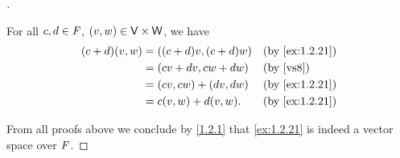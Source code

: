 \begin{proof}[]
\begin{description}
			For all \(c, d \in \mathit{F}\), \((v, w) \in \mathsf{V} \times \mathsf{W}\), we have
			\begin{align*}
				(c + d) (v, w) & = ((c + d) v, (c + d) w) &  & \text{(by \cref{ex:1.2.21})} \\
				               & = (cv + dv, cw + dw)     &  & \text{(by \ref{vs8})}        \\
				               & = (cv, cw) + (dv, dw)    &  & \text{(by \cref{ex:1.2.21})} \\
				               & = c(v, w) + d(v, w).     &  & \text{(by \cref{ex:1.2.21})}
			\end{align*}
	\end{description}
	From all proofs above we conclude by \cref{1.2.1} that \cref{ex:1.2.21} is indeed a vector space over \(\mathit{F}\).
\end{proof}
